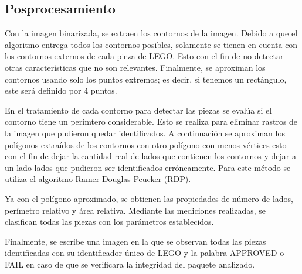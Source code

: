 \documentclass[letterpaper]{scrreprt}
\begin{document}
\subsection{Posprocesamiento}

Con la imagen binarizada, se extraen los contornos de la imagen. Debido a que el algoritmo entrega todos los contornos posibles, solamente se tienen en cuenta con los contornos externos de cada pieza de LEGO. Esto con el fin de no detectar otras características que no son relevantes. Finalmente, se aproximan los contornos usando solo los puntos extremos; es decir, si tenemos un rectángulo, este será definido por 4 puntos.

En el tratamiento de cada contorno para detectar las piezas se evalúa si el contorno tiene un perímtero considerable. Esto se realiza para eliminar rastros de la imagen que pudieron quedar identificados. A continuación se aproximan los polígonos extraídos de los contornos con otro polígono con menos vértices esto con el fin de dejar la cantidad real de lados que contienen los contornos y dejar a un lado lados que pudieron ser identificados erróneamente. Para este método se utiliza el algoritmo Ramer-Douglas-Peucker (RDP).

Ya con el polígono aproximado, se obtienen las propiedades de número de lados, perímetro relativo y área relativa. Mediante las mediciones realizadas, se clasifican todas las piezas con los parámetros establecidos.

Finalmente, se escribe una imagen en la que se observan todas las piezas identificadas con su identificador único de LEGO y la palabra APPROVED o FAIL en caso de que se verificara la integridad del paquete analizado.
\end{document}
